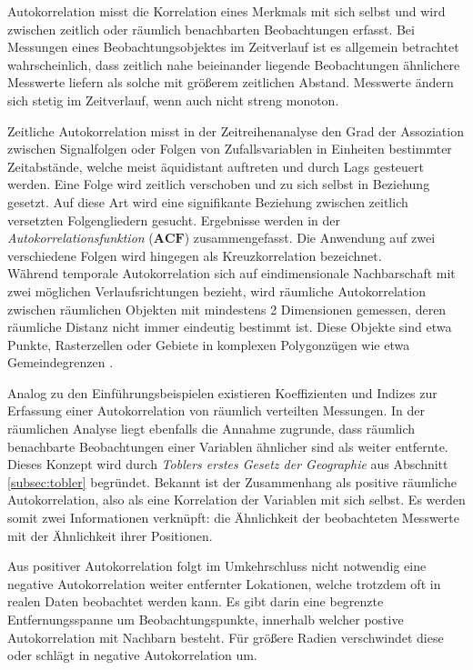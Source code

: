 Autokorrelation misst die Korrelation eines Merkmals mit sich selbst und wird zwischen zeitlich oder räumlich 
benachbarten Beobachtungen erfasst. Bei Messungen eines Beobachtungsobjektes im Zeitverlauf ist es allgemein betrachtet
wahrscheinlich, dass zeitlich nahe beieinander liegende Beobachtungen ähnlichere Messwerte liefern als solche mit 
größerem zeitlichen Abstand. Messwerte ändern sich stetig im Zeitverlauf, wenn auch nicht streng monoton. 

Zeitliche Autokorrelation misst in der Zeitreihenanalyse den Grad der Assoziation zwischen Signalfolgen 
oder Folgen von Zufallsvariablen in Einheiten bestimmter Zeitabstände, welche meist äquidistant auftreten und durch Lags gesteuert werden. 
Eine Folge wird zeitlich verschoben und zu sich selbst in Beziehung gesetzt. 
Auf diese Art wird eine signifikante Beziehung zwischen zeitlich versetzten 
Folgengliedern gesucht. Ergebnisse werden in der \emph{Autokorrelationsfunktion} ($\mathbf{ACF}$) zusammengefasst. 
Die Anwendung auf zwei verschiedene Folgen wird hingegen als Kreuzkorrelation bezeichnet.\\

Während temporale Autokorrelation sich auf eindimensionale Nachbarschaft mit zwei möglichen Verlaufsrichtungen bezieht, 
wird räumliche Autokorrelation zwischen räumlichen Objekten mit mindestens 2 Dimensionen gemessen, 
deren räumliche Distanz nicht immer eindeutig bestimmt ist. Diese Objekte sind etwa Punkte, 
Rasterzellen oder Gebiete in komplexen Polygonzügen wie etwa Gemeindegrenzen \cite[S.260]{fischer_handbook_2010}.

Analog zu den Einführungsbeispielen existieren Koeffizienten und Indizes zur Erfassung einer 
Autokorrelation von räumlich verteilten Messungen. In der räumlichen Analyse liegt ebenfalls die Annahme zugrunde, 
dass räumlich benachbarte Beobachtungen einer Variablen ähnlicher sind als weiter entfernte. 
Dieses Konzept wird durch \emph{Toblers erstes Gesetz der Geographie} aus Abschnitt \ref{subsec:tobler} begründet. 
Bekannt ist der Zusammenhang als positive räumliche Autokorrelation, also als eine Korrelation der Variablen mit sich selbst. 
Es werden somit zwei Informationen verknüpft: die Ähnlichkeit der beobachteten Messwerte mit der Ähnlichkeit ihrer Positionen. 

Aus positiver Autokorrelation folgt im Umkehrschluss nicht notwendig eine negative Autokorrelation weiter entfernter Lokationen, 
welche trotzdem oft in realen Daten beobachtet werden kann. 
Es gibt darin eine begrenzte Entfernungsspanne um Beobachtungspunkte, innerhalb welcher postive Autokorrelation mit Nachbarn besteht. 
Für größere Radien verschwindet diese oder schlägt in negative Autokorrelation um.


